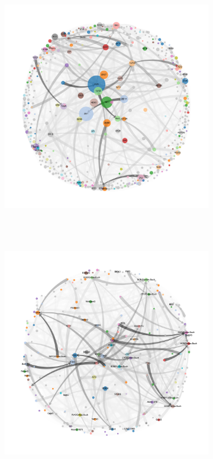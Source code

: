 \documentclass[varwidth, border=5pt]{standalone}
\begin{document}
	
	\begin{figure}
\centering
\hspace*{-0.025\linewidth}\begin{subfigure}{0.5\linewidth}
	\includegraphics[width=1.085\linewidth]{../../graphics/chapter-graph-1994-us.pdf}~%
\end{subfigure}~%
\begin{subfigure}{0.5\linewidth}
	\includegraphics[width=1.085\linewidth]{../../graphics/chapter-graph-1994-de.pdf}~%

\end{subfigure}
\end{figure}
\end{document}
